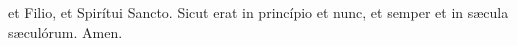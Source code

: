 et Filio, et Spirítui Sancto. Sicut erat in princípio et nunc, et semper et in s{\ae}cula s{\ae}culórum. Amen.